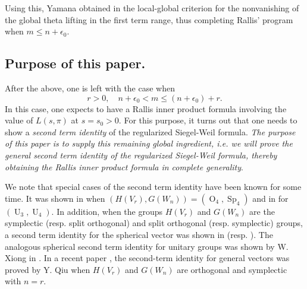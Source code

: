 \documentclass[10pt]{amsart}
\theoremstyle{plain}
\numberwithin{equation}{section}
\begin{document}
Using this, Yamana obtained in \cite{Y4} the local-global
criterion for the nonvanishing of the global theta lifting in the
first term range, thus completing Rallis' program when $m \leq n +
\epsilon_0$.

 \vskip 5pt
  

\subsection{\bf Purpose of this paper.}
After the above, one is left with the case when
\[  
r > 0, \quad     n+ \epsilon_0 < m \leq (n+ \epsilon_0) + r. 
\]  
In this case, one expects to have a Rallis inner product formula
involving the value of $L(s, \pi)$ at $s = s_0 > 0$. For this
purpose, it turns out that 
one needs to show a {\em second term identity} of the regularized Siegel-Weil formula. 
\vskip 5pt
 {\em The purpose of this paper is to supply this remaining global
   ingredient, i.e. we will prove the general second term identity of
   the regularized Siegel-Weil formula, thereby obtaining the Rallis
   inner product formula  in complete generality}.  
 \vskip 5pt

 We note that special cases of the second term identity have been
 known for some time. It was shown in \cite{KRS} when $(H(V_r) , G(W_n))
 = ({\operatorname{O}}_4, {\operatorname{Sp}}_4)$ and in \cite{T1} for $({\operatorname{U}}_3, {\operatorname{U}}_4)$. In addition, when
 the groups $H(V_r)$ and $G(W_n)$ are the symplectic
 (resp. split orthogonal) and split orthogonal (resp. symplectic) groups, a second
 term identity for the spherical vector  was shown in \cite{GT}
 (resp. \cite{K3}). The analogous spherical second
 term identity for unitary groups was shown by W. Xiong in \cite{X}. In a recent 
 paper \cite{Q}, the second-term identity for general vectors was proved by Y. Qiu when 
 $H(V_r)$ and $G(W_n)$ are orthogonal and symplectic with $n=r$.
 \vskip 10pt
 
\end{document}
